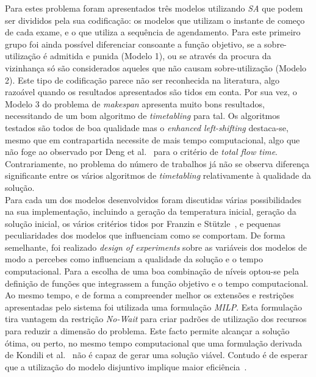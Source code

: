 Para estes problema foram apresentados três modelos utilizando \textit{SA} que podem ser divididos pela sua codificação: os modelos que utilizam o instante de começo de cada exame, e o que utiliza a sequência de agendamento. Para este primeiro grupo foi ainda possível diferenciar consoante a função objetivo, se a sobre-utilização é admitida e punida (Modelo 1), ou se através da procura da vizinhança só são considerados aqueles que não causam sobre-utilização (Modelo 2). Este tipo de codificação parece não ser reconhecida na literatura, algo razoável quando os resultados apresentados são tidos em conta. Por sua vez, o Modelo 3 do problema de \textit{makespan} apresenta muito bons resultados, necessitando de um bom algoritmo de \textit{timetabling} para tal. Os algoritmos testados são todos de boa qualidade mas o \textit{enhanced left-shifting} destaca-se, mesmo que em contrapartida necessite de mais tempo computacional, algo que não foge ao observado por Deng et al.~\cite{dengTotalFlowTime2019} para o critério de \textit{total flow time}. Contrariamente, no problema do número de trabalhos já não se observa diferença significante entre os vários algoritmos de \textit{timetabling} relativamente à qualidade da solução.\\

Para cada um dos modelos desenvolvidos foram discutidas várias possibilidades na sua implementação, incluindo a geração da temperatura inicial, geração da solução inicial, os vários critérios tidos por Franzin e Stützle~\cite{franzinRevisitingSimulatedAnnealing2019}, e pequenas peculiaridades dos modelos que influenciam como se comportam. De forma semelhante, foi realizado \textit{design of experiments} sobre as variáveis dos modelos de modo a percebes como influenciam a qualidade da solução e o tempo computacional. Para a escolha de uma boa combinação de níveis optou-se pela definição de funções que integrassem a função objetivo e o tempo computacional.\\

Ao mesmo tempo, e de forma a compreender melhor os extensões e restrições apresentadas pelo sistema foi utilizada uma formulação \textit{MILP}. Esta formulação tira vantagem da restrição \textit{No-Wait} para criar padrões de utilização dos recursos para reduzir a dimensão do problema. Este facto permite alcançar a solução ótima, ou perto, no mesmo tempo computacional que uma formulação derivada de Kondili et al.~\cite{kondiliGeneralAlgorithmShortterm1993} não é capaz de gerar uma solução viável. Contudo é de esperar que a utilização do modelo disjuntivo implique maior eficiência~\cite{kuMixedIntegerProgramming2016}.\\

